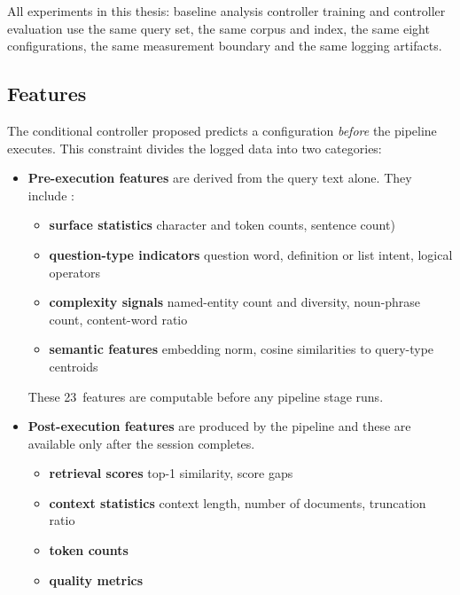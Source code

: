 
All experiments in this thesis: baseline analysis controller training
and controller evaluation use the same query set, the same corpus and
index, the same eight configurations, the same measurement boundary and the
same logging artifacts.


\subsection{Features}
\label{subsec:router-features}


The conditional controller proposed predicts a
configuration \emph{before} the pipeline executes. This constraint divides the
logged data into two categories:

\begin{itemize}
    \item \textbf{Pre-execution features} are derived from the query text alone.
          They include :
          \begin{itemize}
            \item \textbf{surface statistics} character and token counts, sentence count)
            \item \textbf{question-type indicators} question word, definition or list intent, logical operators
            \item \textbf{complexity signals} named-entity count and diversity, noun-phrase count, content-word ratio
            \item \textbf{semantic features} embedding norm, cosine similarities to query-type centroids
          \end{itemize}
          These 23~features are computable before any pipeline stage runs.
    \item \textbf{Post-execution features} are produced by the pipeline and these are available only after the session completes.
    \begin{itemize}
            \item \textbf{retrieval scores } top-1 similarity, score gaps
            \item \textbf{context statistics} context length, number of documents, truncation ratio
            \item \textbf{token counts} 
            \item \textbf{quality metrics} 
      \end{itemize}

\end{itemize}

